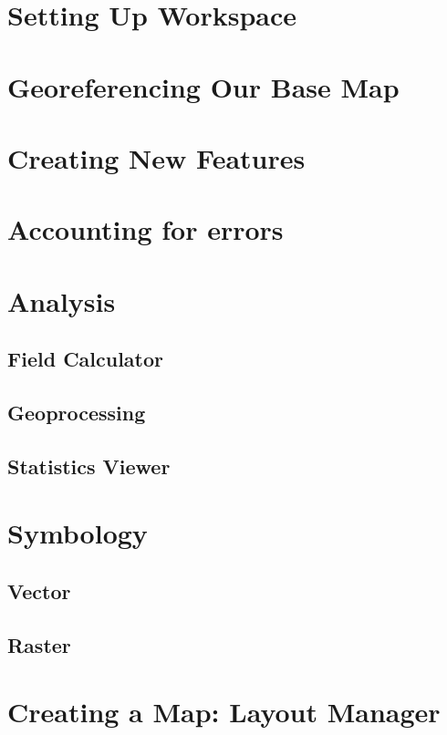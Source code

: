 \documentclass{article}
\begin{document}
\section{Setting Up Workspace}

\section{Georeferencing Our Base Map}

\section{Creating New Features}

\section{Accounting for errors}

\section{Analysis}

\subsection{Field Calculator}

\subsection{Geoprocessing}

\subsection{Statistics Viewer}

\section{Symbology}

\subsection{Vector}

\subsection{Raster}

\section{Creating a Map: Layout Manager}
\end{document}
